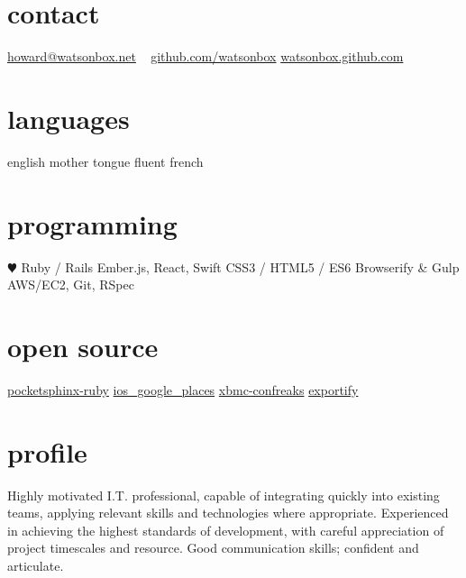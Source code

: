 \documentclass[]{friggeri-cv} %
\begin{document}


\begin{aside} %
\section{contact}
\href{mailto:howard@watsonbox.net}{howard@watsonbox.net}
~
\href{http://github.com/watsonbox}{github.com/watsonbox}
\href{http://watsonbox.github.com}{watsonbox.github.com}
\section{languages}
english mother tongue
fluent french
\section{programming}
{\color{red} $\varheartsuit$} Ruby / Rails
Ember.js, React, Swift
CSS3 / HTML5 / ES6
Browserify \& Gulp
AWS/EC2, Git, RSpec
\section{open source}
\href{https://github.com/watsonbox/pocketsphinx-ruby}{pocketsphinx-ruby}
\href{https://github.com/watsonbox/ios_google_places_autocomplete}{ios\_google\_places}
\href{https://github.com/watsonbox/xbmc-confreaks}{xbmc-confreaks}
\href{https://github.com/watsonbox/exportify}{exportify}
\end{aside}


\section{profile}

Highly motivated I.T. professional, capable of integrating quickly into existing teams, applying relevant skills and technologies where appropriate. Experienced in achieving the highest standards of development, with careful appreciation of project timescales and resource. Good communication skills; confident and articulate.
\end{document}
